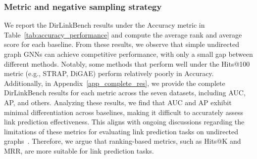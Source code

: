 \begin{table}[h]
    \centering
    \caption{Comparison of negative sampling strategy on Cora-ML and CiteSeer datasets.}
    
    \label{app_sample}
\end{table}

\subsubsection{Metric and negative sampling strategy}\label{app_metrci_sampling}
We report the DirLinkBench results under the Accuracy metric in Table~\ref{tab:accuracy_performance} and compute the average rank and average score for each baseline. From these results, we observe that simple undirected graph GNNs can achieve competitive performance, with only a small gap between different methods. Notably, some methods that perform well under the Hits@100 metric (e.g., STRAP, DiGAE) perform relatively poorly in Accuracy. Additionally, in Appendix~\ref{app_complete_res}, we provide the complete DirLinkBench results for each metric across the seven datasets, including AUC, AP, and others. Analyzing these results, we find that AUC and AP exhibit minimal differentiation across baselines, making it difficult to accurately assess link prediction effectiveness. This aligns with ongoing discussions regarding the limitations of these metrics for evaluating link prediction tasks on undirected graphs~\cite{yang2015evaluating,li2023evaluating}. Therefore, we argue that ranking-based metrics, such as Hits@K and MRR, are more suitable for link prediction tasks.


